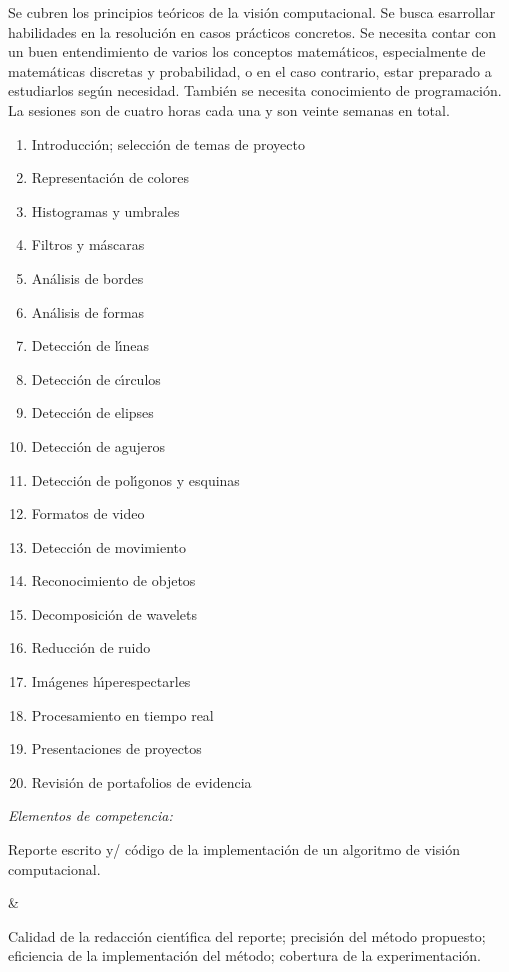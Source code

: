 \documentclass[10 pt]{article}
\begin{document}
Se cubren los principios te\'{o}ricos de la visi\'{o}n computacional.  Se
busca esarrollar habilidades en la resoluci\'{o}n en casos
pr\'{a}cticos concretos. Se necesita contar con un buen entendimiento
de varios los conceptos matem\'{a}ticos, especialmente de
matem\'{a}ticas discretas y probabilidad, o en el caso contrario,
estar preparado a estudiarlos seg\'{u}n necesidad. Tambi\'{e}n se
necesita conocimiento de programaci\'{o}n.  La sesiones son de cuatro
horas cada una y son veinte semanas en total.
\begin{enumerate}[itemsep=-3pt]
\item{Introducci\'{o}n; selecci\'{o}n de temas de proyecto}
\item{Representaci\'{o}n de colores}
\item{Histogramas y umbrales}
\item{Filtros y m\'{a}scaras}
\item{An\'{a}lisis de bordes}
\item{An\'{a}lisis de formas}
\item{Detecci\'{o}n de l\'{\i}neas}
\item{Detecci\'{o}n de c\'{\i}rculos}
\item{Detecci\'{o}n de elipses}
\item{Detecci\'{o}n de agujeros}
\item{Detecci\'{o}n de pol\'{\i}gonos y esquinas}
\item{Formatos de video}
\item{Detecci\'{o}n de movimiento}
\item{Reconocimiento de objetos}
\item{Decomposici\'{o}n de wavelets}
\item{Reducci\'{o}n de ruido}
\item{Im\'{a}genes h\'{\i}perespectarles}
\item{Procesamiento en tiempo real}
\item{Presentaciones de proyectos}
\item{Revisi\'{o}n de portafolios de evidencia}
\end{enumerate}

{\em Elementos de competencia:}


Reporte escrito y/ c\'{o}digo de la implementaci\'{o}n de un algoritmo de
visi\'{o}n computacional.

&

Calidad de la redacci\'{o}n cient\'{\i}fica del reporte; precisi\'{o}n
del m\'{e}todo propuesto; eficiencia de la implementaci\'{o}n del
m\'{e}todo; cobertura de la experimentaci\'{o}n.
\end{document}
